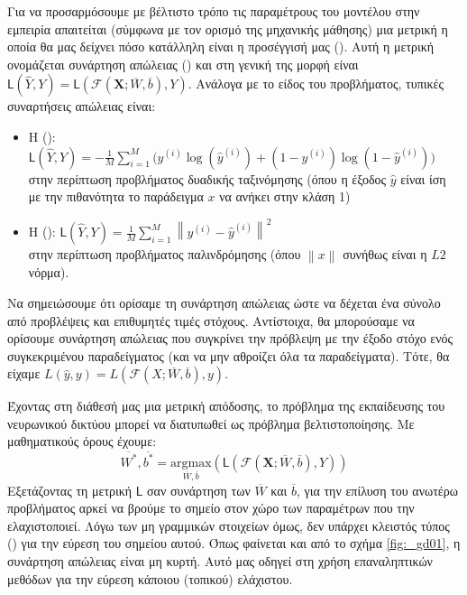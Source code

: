 Για να προσαρμόσουμε με βέλτιστο τρόπο τις παραμέτρους του μοντέλου στην εμπειρία απαιτείται (σύμφωνα με τον ορισμό της μηχανικής μάθησης) μια μετρική η οποία θα μας δείχνει πόσο κατάλληλη είναι η προσέγγισή μας (). Αυτή η μετρική ονομάζεται συνάρτηση απώλειας () και στη γενική της μορφή είναι \( \mathsf{L}(\hat{Y},Y) = \mathsf{L}(\mathcal{F}(\boldsymbol{X};\overline{W},\overline{b}),Y)\). Ανάλογα με το είδος του προβλήματος, τυπικές συναρτήσεις απώλειας είναι:
\begin{itemize}
  \item H (): $\mathsf{L}(\hat{Y},Y) = -\frac{1}{M}\sum_{i = 1}^{M} \big(y^{(i)}\log(\hat{y}^{(i)}) + (1 - y^{(i)})\log(1 - \hat{y}^{(i)})\big)$ \\στην περίπτωση προβλήματος δυαδικής ταξινόμησης (όπου η έξοδος $\hat{y}$ είναι ίση με την πιθανότητα το παράδειγμα $x$ να ανήκει στην κλάση 1)
  \item Η (): $\mathsf{L}(\hat{Y},Y) = \frac{1}{M}\sum_{i = 1}^{M}{\left\lVert y^{(i)} - \hat{y}^{(i)}\right\rVert}^2 $\\ στην περίπτωση προβλήματος παλινδρόμησης (όπου $\left\lVert x \right\rVert$ συνήθως είναι η $L2$ νόρμα).
\end{itemize}
Να σημειώσουμε ότι ορίσαμε τη συνάρτηση απώλειας ώστε να δέχεται ένα σύνολο από προβλέψεις και επιθυμητές τιμές στόχους. Αντίστοιχα, θα μπορούσαμε να ορίσουμε συνάρτηση απώλειας που συγκρίνει την πρόβλεψη με την έξοδο στόχο ενός συγκεκριμένου παραδείγματος (και να μην αθροίζει όλα τα παραδείγματα). Τότε, θα είχαμε \( L(\hat{y},y) = L(\mathcal{F}(X;\overline{W},\overline{b}),y)\). \par

Έχοντας στη διάθεσή μας μια μετρική απόδοσης, το πρόβλημα της εκπαίδευσης του νευρωνικού δικτύου μπορεί να διατυπωθεί ως πρόβλημα βελτιστοποίησης. Με μαθηματικούς όρους έχουμε:
\begin{equation}
  \overline{W^*},\overline{b^*} = \underset{\overline{W},\overline{b}}{\mathrm{argmax}}(\mathsf{L}(\mathcal{F}(\boldsymbol{X};\overline{W},\overline{b}),Y))
\end{equation}
Εξετάζοντας τη μετρική $\mathsf{L}$ σαν συνάρτηση των $\overline{W}$ και $\overline{b}$, για την επίλυση του ανωτέρω προβλήματος αρκεί να βρούμε το σημείο στον χώρο των παραμέτρων που την ελαχιστοποιεί. Λόγω των μη γραμμικών στοιχείων όμως, δεν υπάρχει κλειστός τύπος () για την εύρεση του σημείου αυτού. Όπως φαίνεται και από το σχήμα \ref{fig:_gd01}, η συνάρτηση απώλειας είναι μη κυρτή. Αυτό μας οδηγεί στη χρήση επαναληπτικών μεθόδων για την εύρεση κάποιου (τοπικού) ελάχιστου. \par

